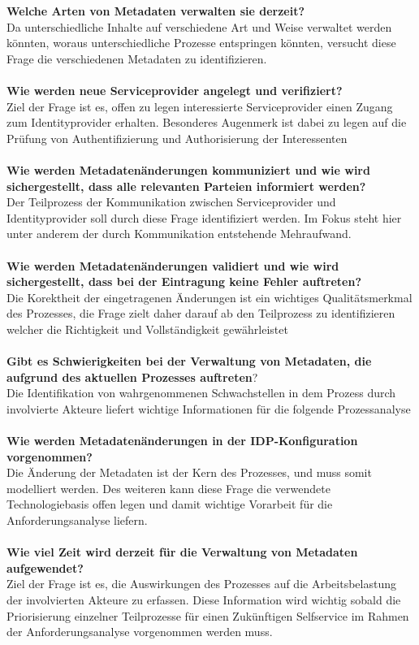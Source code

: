 \documentclass[a4paper, fontsize=12pt]{scrartcl}
\begin{document}
\textbf{Welche Arten von Metadaten verwalten sie derzeit?}\\
Da unterschiedliche Inhalte auf verschiedene Art und Weise verwaltet werden könnten, woraus unterschiedliche Prozesse entspringen könnten, versucht diese Frage die verschiedenen Metadaten zu identifizieren.\\\\
\textbf{Wie werden neue Serviceprovider angelegt und verifiziert?}\\
Ziel der Frage ist es, offen zu legen interessierte Serviceprovider einen Zugang zum Identityprovider erhalten. Besonderes Augenmerk ist dabei zu legen auf die Prüfung von Authentifizierung und Authorisierung der Interessenten\\\\
\textbf{Wie werden Metadatenänderungen kommuniziert und wie wird sichergestellt, dass alle relevanten Parteien informiert werden?}\\
Der Teilprozess der Kommunikation zwischen Serviceprovider und Identityprovider soll durch diese Frage identifiziert werden. Im Fokus steht hier unter anderem der durch Kommunikation entstehende Mehraufwand.\\\\
\textbf{Wie werden Metadatenänderungen validiert und wie wird sichergestellt, dass bei der Eintragung keine Fehler auftreten?}\\
Die Korektheit der eingetragenen Änderungen ist ein wichtiges Qualitätsmerkmal des Prozesses, die Frage zielt daher darauf ab den Teilprozess zu identifizieren welcher die Richtigkeit und Vollständigkeit gewährleistet\\\\
\textbf{Gibt es Schwierigkeiten bei der Verwaltung von Metadaten, die aufgrund des aktuellen Prozesses auftreten}?\\
 Die Identifikation von wahrgenommenen Schwachstellen in dem Prozess durch involvierte Akteure liefert wichtige Informationen für die folgende Prozessanalyse\\\\
\textbf{Wie werden Metadatenänderungen in der IDP-Konfiguration vorgenommen?}\\
Die Änderung der Metadaten ist der Kern des Prozesses, und muss somit modelliert werden. Des weiteren kann diese Frage die verwendete Technologiebasis offen legen und damit wichtige Vorarbeit für die Anforderungsanalyse liefern.\\\\
\textbf{Wie viel Zeit wird derzeit für die Verwaltung von Metadaten aufgewendet?}\\
Ziel der Frage ist es, die Auswirkungen des Prozesses auf die Arbeitsbelastung der involvierten Akteure zu erfassen. Diese Information wird wichtig sobald die Priorisierung einzelner Teilprozesse für einen Zukünftigen Selfservice im Rahmen der Anforderungsanalyse vorgenommen werden muss.\\\\
\end{document}
